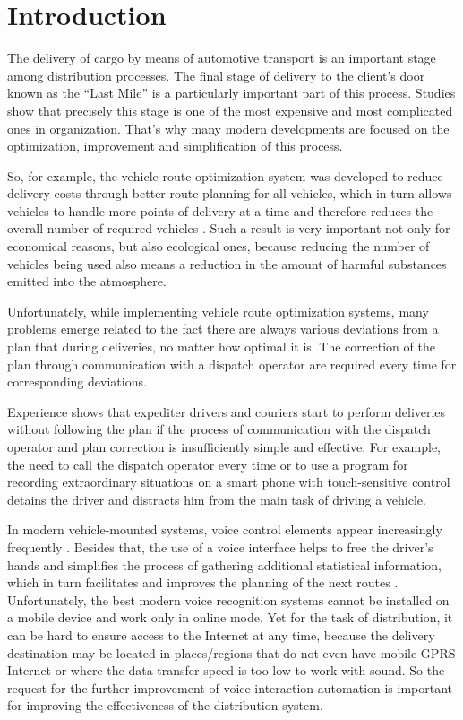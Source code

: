 \section{Introduction}

The delivery of cargo by means of automotive transport is an important stage among distribution processes. The final stage of delivery to the client’s door known as the “Last Mile” is a particularly important part of this process. Studies show that precisely this stage is one of the most expensive and most complicated ones in organization. That’s why many modern developments are focused on the optimization, improvement and simplification of this process.

So, for example, the vehicle route optimization system was developed to reduce delivery costs through better route planning for all vehicles, which in turn allows vehicles to handle more points of delivery at a time and therefore reduces the overall number of required vehicles \cite{art1}. Such a result is very important not only for economical reasons, but also ecological ones, because reducing the number of vehicles being used also means a reduction in the amount of harmful substances emitted into the atmosphere.

Unfortunately, while implementing vehicle route optimization systems, many problems emerge related to the fact there are always various deviations from a plan that during deliveries, no matter how optimal it is. The correction of the plan through communication with a dispatch operator are required every time for corresponding deviations.

Experience shows that expediter drivers and couriers start to perform deliveries without following the plan if the process of communication with the dispatch operator and plan correction is insufficiently simple and effective. For example, the need to call the dispatch operator every time or to use a program for recording extraordinary situations on a smart phone with touch-sensitive control detains the driver and distracts him from the main task of driving a vehicle.

In modern vehicle-mounted systems, voice control elements appear increasingly frequently \cite{art2,Kravchenko_2009,Heisterkamp_2001}. Besides that, the use of a voice interface helps to free the driver’s hands and simplifies the process of gathering additional statistical information, which in turn facilitates and improves the planning of the next routes \cite{conf9}. Unfortunately, the best modern voice recognition systems cannot be installed on a mobile device and work only in online mode. Yet for the task of distribution, it can be hard to ensure access to the Internet at any time, because the delivery destination may be located in places/regions that do not even have mobile GPRS Internet or where the data transfer speed is too low to work with sound. So the request for the further improvement of voice interaction automation is important for improving the effectiveness of the distribution system.


